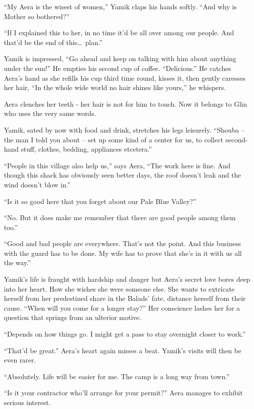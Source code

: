 \documentclass[twoside,11pt]{book}
\begin{document}
``My Aera is the wisest of women,'' Yamik claps his hands softly. ``And why is Mother so bothered?''

``If I explained this to her, in no time it'd be all over among our people. And that'd be the end of this\dots\ plan.''


Yamik is impressed, ``Go ahead and keep on talking with him about anything under the sun!'' He empties his second cup of
coffee. ``Delicious.'' He catches Aera's hand as she refills his cup third time round, kisses it, then gently caresses
her hair, ``In the whole wide world no hair shines like yours,'' he whispers.

Aera clenches her teeth - her hair is not for him to touch. Now it belongs to Glin who uses the very same words.

Yamik, sated by now with food and drink, stretches his legs leisurely. ``Shouba -- the man I told you about -- set up
some kind of a center for us, to collect second-hand stuff, clothes, bedding, appliances etcetera.''

``People in this village also help us,'' says Aera, ``The work here is fine. And though this shack has obviously seen
better days, the roof doesn't leak and the wind doesn't blow in.''

``Is it so good here that you forget about our Pale Blue Valley?''

``No. But it does make me remember that there are good people among them too.''

``Good and bad people are everywhere. That's not the point. And this business with the guard has to be done. My wife
has to prove that she's in it with us all the way.''

Yamik's life is fraught with hardship and danger but Aera's secret love bores deep into her heart. How she wishes she
were someone else. She wants to extricate herself from her predestined share in the Balads' fate, distance herself from
their cause. ``When will you come for a longer stay?'' Her conscience lashes her for a question that springs from an
ulterior motive.

``Depends on how things go. I might get a pass to stay overnight closer to work.''

``That'd be great.'' Aera's heart again misses a beat. Yamik's visits will then be even rarer.

``Absolutely. Life will be easier for me. The camp is a long way from town.''

``Is it your contractor who'll arrange for your permit?'' Aera manages to exhibit serious interest.
\end{document}
